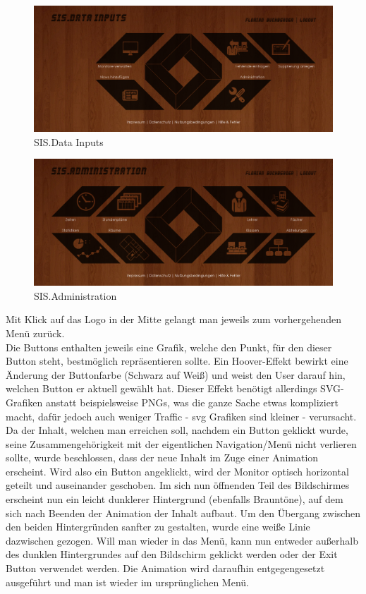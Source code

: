 \begin{figure}[H]
\centering
\includegraphics[keepaspectratio=true, width=14cm]{images/screenshots/data-inputs_nohover.png}
\caption{SIS.Data Inputs}
\label{fig:content_draft_design_datainputs}
\end{figure}
\begin{figure}[H]
\centering
\includegraphics[keepaspectratio=true, width=14cm]{images/screenshots/administration_nohover.png}
\caption{SIS.Administration}
\label{fig:content_draft_design_administration}
\end{figure}
Mit Klick auf das Logo in der Mitte gelangt man jeweils zum vorhergehenden Menü zurück.\\
Die Buttons enthalten jeweils eine Grafik, welche den Punkt, für den dieser Button steht, bestmöglich repräsentieren sollte. Ein Hoover-Effekt bewirkt eine Änderung der Buttonfarbe (Schwarz auf Weiß) und weist den User darauf hin, welchen Button er aktuell gewählt hat. Dieser Effekt benötigt allerdings SVG-Grafiken anstatt beispielsweise PNGs, was die ganze Sache etwas kompliziert macht, dafür jedoch auch weniger Traffic - svg Grafiken sind kleiner - verursacht.\\
Da der Inhalt, welchen man erreichen soll, nachdem ein Button geklickt wurde, seine Zusammengehörigkeit mit der eigentlichen Navigation/Menü nicht verlieren sollte, wurde beschlossen, dass der neue Inhalt im Zuge einer Animation erscheint. Wird also ein Button angeklickt, wird der Monitor optisch horizontal geteilt und auseinander geschoben. Im sich nun öffnenden Teil des Bildschirmes erscheint nun ein leicht dunklerer Hintergrund (ebenfalls Brauntöne), auf dem sich nach Beenden der Animation der Inhalt aufbaut. Um den Übergang zwischen den beiden Hintergründen sanfter zu gestalten, wurde eine weiße Linie dazwischen gezogen. Will man wieder in das Menü, kann nun entweder außerhalb des dunklen Hintergrundes auf den Bildschirm geklickt werden oder der Exit Button verwendet werden. Die Animation wird daraufhin entgegengesetzt ausgeführt und man ist wieder im ursprünglichen Menü.\\
